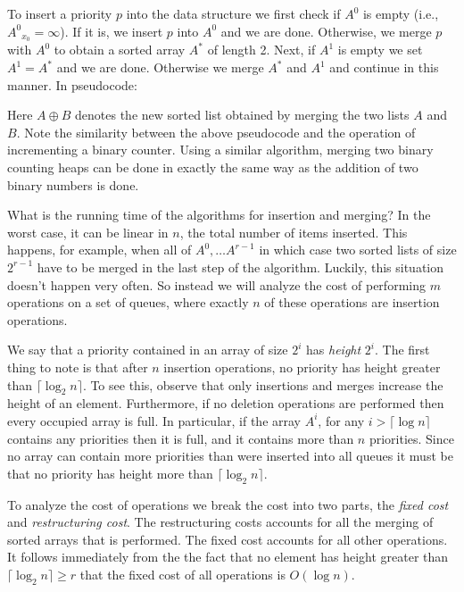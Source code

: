 To insert a priority $p$ into the data structure we first check if
$A^0$ is empty (i.e., $A^0{}_{x_0}=\infty$).  If it is, we insert $p$
into $A^0$ and we are done.  Otherwise, we merge $p$ with $A^0$ to
obtain a sorted array $A^*$ of length 2.  Next, if $A^1$ is empty we 
set $A^1=A^*$ and we are done.  Otherwise we merge $A^*$ and $A^1$ and
continue in this manner.  In pseudocode:

\begin{algorithmic}[1]
\ENDWHILE
{}
\end{algorithmic}

Here $A\oplus B$ denotes the new sorted list obtained by merging the
two lists $A$ and $B$.  Note the similarity between the above
pseudocode and the operation of incrementing a binary counter.  Using
a similar algorithm, merging two binary counting heaps can be done in
exactly the same way as the addition of two binary numbers is done.

What is the running time of the algorithms for insertion and merging?
In the worst case, it can be linear in $n$, the total number of items
inserted.  This happens, for example, when all of $A^0,\ldots A^{r-1}$
in which case two sorted lists of size $2^{r-1}$ have to be merged in
the last step of the algorithm.  Luckily, this situation doesn't
happen very often.  So instead we will analyze the cost of performing
$m$ operations on a set of queues, where exactly $n$ of these
operations are insertion operations.

We say that a priority contained in an array of size $2^i$ has
\emph{height} $2^i$.  The first thing to note is that after $n$
insertion operations, no priority has height greater than
$\lceil\log_2 n\rceil$.  To see this, observe that only insertions and
merges increase the height of an element.  Furthermore, if no deletion
operations are performed then every occupied array is full.  In
particular, if the array $A^i$, for any $i>\lceil\log n\rceil$
contains any priorities then it is full, and it contains more than $n$
priorities.  Since no array can contain more priorities than were
inserted into all queues it must be that no priority has height more
than $\lceil\log_2 n\rceil$.

To analyze the cost of operations we break the cost into two parts,
the \emph{fixed cost} and \emph{restructuring cost}.  The
restructuring costs accounts for all the merging of sorted arrays that
is performed.  The fixed cost accounts for all other operations.  It
follows immediately from the the fact that no element has height
greater than $\lceil\log_2 n\rceil\ge r$ that the fixed cost of all
operations is $O(\log n)$.

